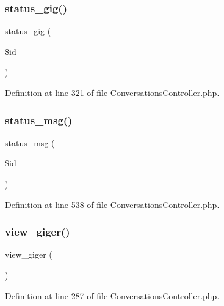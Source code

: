 \subsubsection{\texorpdfstring{status\_gig()}{status\_gig()}}
{\footnotesize\ttfamily status\+\_\+gig (\begin{DoxyParamCaption}\item[{}]{\$id }\end{DoxyParamCaption})}



Definition at line 321 of file Conversations\+Controller.\+php.

\mbox{\label{class_responsive_1_1_http_1_1_controllers_1_1_conversations_controller_adf1139707745e57d581271a95ccb0439}} 
\subsubsection{\texorpdfstring{status\_msg()}{status\_msg()}}
{\footnotesize\ttfamily status\+\_\+msg (\begin{DoxyParamCaption}\item[{}]{\$id }\end{DoxyParamCaption})}



Definition at line 538 of file Conversations\+Controller.\+php.

\mbox{\label{class_responsive_1_1_http_1_1_controllers_1_1_conversations_controller_a5ed047844f3523b725faba37c509cfa8}} 
\subsubsection{\texorpdfstring{view\_giger()}{view\_giger()}}
{\footnotesize\ttfamily view\+\_\+giger (\begin{DoxyParamCaption}{ }\end{DoxyParamCaption})}



Definition at line 287 of file Conversations\+Controller.\+php.

